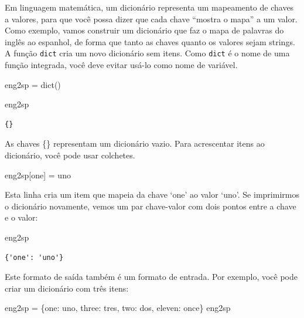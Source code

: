 \documentclass[
  brazilian,
  letterpaper,
  DIV=11,
  numbers=noendperiod]{scrreprt}
\newenvironment{Shaded}{\begin{snugshade}}{\end{snugshade}}
\newcommand{\BuiltInTok}[1]{\textcolor[rgb]{0.00,0.23,0.31}{#1}}
\newcommand{\NormalTok}[1]{\textcolor[rgb]{0.00,0.23,0.31}{#1}}
\newcommand{\OperatorTok}[1]{\textcolor[rgb]{0.37,0.37,0.37}{#1}}
\newcommand{\StringTok}[1]{\textcolor[rgb]{0.13,0.47,0.30}{#1}}
\begin{document}
Em linguagem matemática, um dicionário representa um mapeamento de
chaves a valores, para que você possa dizer que cada chave ``mostra o
mapa'' a um valor. Como exemplo, vamos construir um dicionário que faz o
mapa de palavras do inglês ao espanhol, de forma que tanto as chaves
quanto os valores sejam strings. A função \texttt{dict} cria um novo
dicionário sem itens. Como \texttt{dict} é o nome de uma função
integrada, você deve evitar usá-lo como nome de variável.

\begin{Shaded}
\begin{Highlighting}[]
\NormalTok{eng2sp }\OperatorTok{=} \BuiltInTok{dict}\NormalTok{()}

\NormalTok{eng2sp}
\end{Highlighting}
\end{Shaded}

\begin{verbatim}
{}
\end{verbatim}

As chaves \{\} representam um dicionário vazio. Para acrescentar itens
ao dicionário, você pode usar colchetes.

\begin{Shaded}
\begin{Highlighting}[]
\NormalTok{eng2sp[}\StringTok{\textquotesingle{}one\textquotesingle{}}\NormalTok{] }\OperatorTok{=} \StringTok{\textquotesingle{}uno\textquotesingle{}}
\end{Highlighting}
\end{Shaded}

Esta linha cria um item que mapeia da chave `one' ao valor `uno'. Se
imprimirmos o dicionário novamente, vemos um par chave-valor com dois
pontos entre a chave e o valor:

\begin{Shaded}
\begin{Highlighting}[]
\NormalTok{eng2sp}
\end{Highlighting}
\end{Shaded}

\begin{verbatim}
{'one': 'uno'}
\end{verbatim}

Este formato de saída também é um formato de entrada. Por exemplo, você
pode criar um dicionário com três itens:

\begin{Shaded}
\begin{Highlighting}[]
\NormalTok{eng2sp }\OperatorTok{=}\NormalTok{ \{}\StringTok{\textquotesingle{}one\textquotesingle{}}\NormalTok{: }\StringTok{\textquotesingle{}uno\textquotesingle{}}\NormalTok{, }\StringTok{\textquotesingle{}three\textquotesingle{}}\NormalTok{: }\StringTok{\textquotesingle{}tres\textquotesingle{}}\NormalTok{, }\StringTok{\textquotesingle{}two\textquotesingle{}}\NormalTok{: }\StringTok{\textquotesingle{}dos\textquotesingle{}}\NormalTok{, }\StringTok{\textquotesingle{}eleven\textquotesingle{}}\NormalTok{: }\StringTok{\textquotesingle{}once\textquotesingle{}}\NormalTok{\}}
\NormalTok{eng2sp}
\end{Highlighting}
\end{Shaded}
\end{document}
